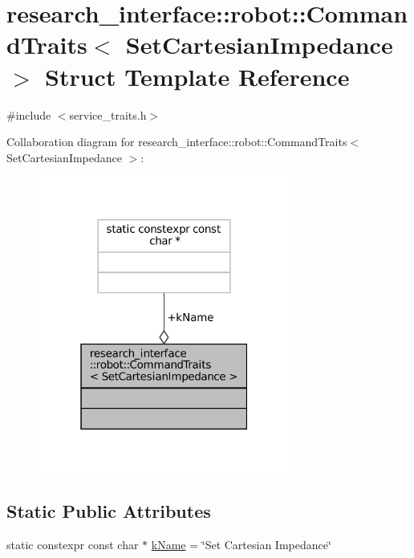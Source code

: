 \hypertarget{structresearch__interface_1_1robot_1_1CommandTraits_3_01SetCartesianImpedance_01_4}{}\section{research\+\_\+interface\+:\+:robot\+:\+:Command\+Traits$<$ Set\+Cartesian\+Impedance $>$ Struct Template Reference}
\label{structresearch__interface_1_1robot_1_1CommandTraits_3_01SetCartesianImpedance_01_4}


{\ttfamily \#include $<$service\+\_\+traits.\+h$>$}



Collaboration diagram for research\+\_\+interface\+:\+:robot\+:\+:Command\+Traits$<$ Set\+Cartesian\+Impedance $>$\+:
\nopagebreak
\begin{figure}[H]
\begin{center}
\leavevmode
\includegraphics[width=235pt]{structresearch__interface_1_1robot_1_1CommandTraits_3_01SetCartesianImpedance_01_4__coll__graph}
\end{center}
\end{figure}
\subsection*{Static Public Attributes}
\begin{DoxyCompactItemize}
\item 
static constexpr const char $\ast$ \hyperlink{structresearch__interface_1_1robot_1_1CommandTraits_3_01SetCartesianImpedance_01_4_a678aef176940e23abe6b5cb5f756e314}{k\+Name} = \char`\"{}Set Cartesian Impedance\char`\"{}
\end{DoxyCompactItemize}


